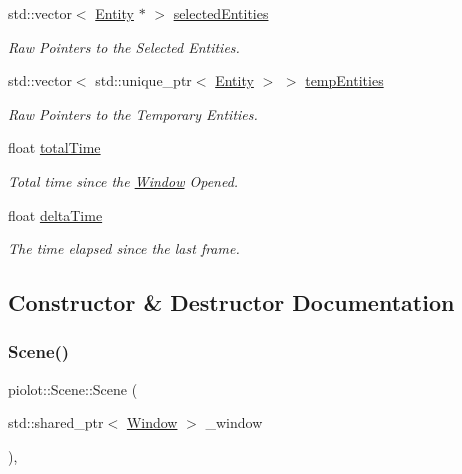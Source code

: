 \begin{DoxyCompactItemize}
std\+::vector$<$ \mbox{\hyperlink{classpiolot_1_1_entity}{Entity}} $\ast$ $>$ \mbox{\hyperlink{classpiolot_1_1_scene_a62abd7ccaa90a04e1f9738de7b2f96d3}{selected\+Entities}}
\begin{DoxyCompactList}\small\item\em Raw Pointers to the Selected Entities. \end{DoxyCompactList}\item 
std\+::vector$<$ std\+::unique\+\_\+ptr$<$ \mbox{\hyperlink{classpiolot_1_1_entity}{Entity}} $>$ $>$ \mbox{\hyperlink{classpiolot_1_1_scene_afb5dae5e574ec94da2b1192070e91327}{temp\+Entities}}
\begin{DoxyCompactList}\small\item\em Raw Pointers to the Temporary Entities. \end{DoxyCompactList}\item 
float \mbox{\hyperlink{classpiolot_1_1_scene_a10140d7b13ab259d8770d9cf44ab8829}{total\+Time}}
\begin{DoxyCompactList}\small\item\em Total time since the \mbox{\hyperlink{class_window}{Window}} Opened. \end{DoxyCompactList}\item 
float \mbox{\hyperlink{classpiolot_1_1_scene_ac3714002379b5e74cc24d947757f4af4}{delta\+Time}}
\begin{DoxyCompactList}\small\item\em The time elapsed since the last frame. \end{DoxyCompactList}\end{DoxyCompactItemize}


\subsection{Constructor \& Destructor Documentation}
\mbox{\label{classpiolot_1_1_scene_af42469b97e0c1006bec5d384223db148}} 
\subsubsection{\texorpdfstring{Scene()}{Scene()}}
{\footnotesize\ttfamily piolot\+::\+Scene\+::\+Scene (\begin{DoxyParamCaption}\item[{std\+::shared\+\_\+ptr$<$ \mbox{\hyperlink{class_window}{Window}} $>$}]{\+\_\+window }\end{DoxyParamCaption})\hspace{0.3cm}{\ttfamily [inline]}, {\ttfamily [explicit]}}

